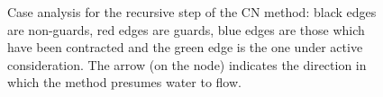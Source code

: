\documentclass[review,a4paper]{elsarticle}
\newenvironment{stusubfig}[1]
{
	\begin{figure}[#1]
	\begin{center}
}
{
	\end{center}
	\end{figure}
}
\begin{document}
\begin{stusubfig}{p}
	\hspace{4mm}%
\caption[Case analysis for the recursive step of the CN method]{Case analysis for the recursive step of the CN method: black edges are non-guards, red edges are guards, blue edges are those which have been contracted and the green edge is the one under active consideration. The arrow (on the node) indicates the direction in which the method presumes water to flow.}
\label{fig:segmentation-waterfall-nicholls-cases}
\end{stusubfig}
\end{document}
